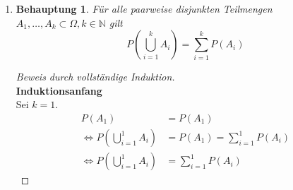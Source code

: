 \documentclass[a4paper]{scrartcl}
\newtheorem*{behaupt}{Behauptung}
\newcommand{\gdw}{\Leftrightarrow}
\begin{document}
\begin{enumerate}[label=\bfseries\arabic*.]
\begin{enumerate}[label=(\roman*)]
            \item
                \begin{behaupt}
                    Für alle paarweise disjunkten Teilmengen
                    $A_1, \ldots, A_k \subset \Omega, k \in \mathbb{N}$ gilt
                    \begin{equation*}
                        P \left( \bigcup_{i=1}^k A_i \right)
                        = \sum_{i=1}^k P(A_i)
                    \end{equation*}
                    
                \end{behaupt}
                \begin{proof}[Beweis durch vollständige Induktion] \hfill \\
                    \textbf{Induktionsanfang} \\
                    Sei $k = 1$.
                    \begin{equation}
                        \begin{split}
                            P(A_1) &= P(A_1) \\
                            \gdw P \left( \bigcup_{i=1}^1 A_i \right)
                            &= P(A_1) = \sum_{i=1}^1 P(A_i) \\
                            \gdw P \left( \bigcup_{i=1}^1 A_i \right)
                            &= \sum_{i=1}^1 P(A_i)
                        \end{split}
                    \end{equation}
                    

\end{proof}
\end{enumerate}
\end{enumerate}
\end{document}
